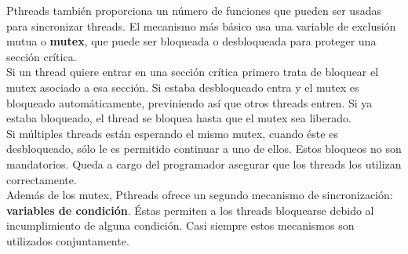 Pthreads también proporciona un número de funciones que pueden ser usadas para sincronizar threads. El mecanismo más básico usa una variable
de exclusión mutua o \textbf{mutex}, que puede ser bloqueada o desbloqueada para proteger una sección crítica.\\
Si un thread quiere entrar en una sección crítica primero trata de bloquear el mutex asociado a esa sección. Si estaba desbloqueado entra y 
el mutex es bloqueado automáticamente, previniendo así que otros threads entren. Si ya estaba bloqueado, el thread se bloquea hasta que el
mutex sea liberado.\\ 
Si múltiples threads están esperando el mismo mutex, cuando éste es desbloqueado, sólo le es permitido continuar a uno de ellos.
Estos bloqueos no son mandatorios. Queda a cargo del programador asegurar que los threads los utilizan correctamente.\\

Además de los mutex, Pthreads ofrece un segundo mecanismo de sincronización: \textbf{variables de condición}. Éstas permiten a los threads 
bloquearse debido al incumplimiento de alguna condición. Casi siempre estos mecanismos son utilizados conjuntamente.

